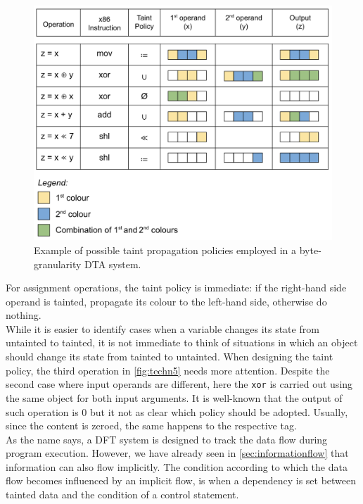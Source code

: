 \documentclass[LaM,binding=0.6cm]{sapthesis}
\begin{document}
\begin{figure}[h!]
\centering
\includegraphics[scale=.6]{images/techn5}
\caption{Example of possible taint propagation policies employed in a byte-granularity DTA system.}
\label{fig:techn5}
\end{figure}

For assignment operations, the taint policy is immediate: if the right-hand side operand is tainted, propagate its colour to the left-hand side, otherwise do nothing.\\
While it is easier to identify cases when a variable changes its state from untainted to tainted, it is not immediate to think of situations in which an object should change its state from tainted to untainted. When designing the taint policy, the third operation in \autoref{fig:techn5} needs more attention. Despite the second case where input operands are different, here the \texttt{xor} is carried out using the same object for both input arguments. It is well-known that the output of such operation is $0$ but it not as clear which policy should be adopted. Usually, since the content is zeroed, the same happens to the respective tag.\\

As the name says, a DFT system is designed to track the data flow during program execution. However, we have already seen in \autoref{sec:informationflow} that information can also flow implicitly. The condition according to which the data flow becomes influenced by an implicit flow, is when a dependency is set between tainted data and the condition of a control statement.
\end{document}
